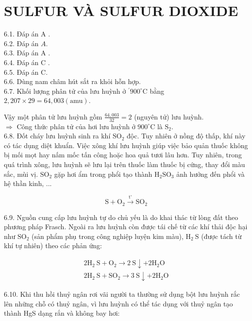 \documentclass[10pt]{article}
\begin{document}
\section*{SULFUR VÀ SULFUR DIOXIDE}
6.1. Đáp án A .\\
6.2. Đáp án $A$.\\
6.3. Đáp án A .\\
6.4. Đáp án C .\\
6.5. Đáp án C.\\
6.6. Dùng nam châm hút sắt ra khỏi hỗn hợp.\\
6.7. Khối lượng phân tử của lưu huỳnh ở $^{\prime} 900^{\circ} \mathrm{C}$ bằng $2,207 \times 29=64,003(\mathrm{amu})$.

Vậy một phân tử lưu huỳnh gồm $\frac{64,003}{32}=2$ (nguyên tử) lưu huỳnh.\\
$\Rightarrow$ Công thức phân tử của hơi lưu huỳnh ở $900^{\circ} \mathrm{C}$ là $\mathrm{S}_{2}$.\\
6.8. Đốt cháy lưu huỳnh sinh ra khí $\mathrm{SO}_{2}$ độc. Tuy nhiên ở nồng độ thấp, khí này có tác dụng diệt khuẩn. Việc xông khí lưu huỳnh giúp việc bảo quản thuốc không bị mối mọt hay nấm mốc tấn công hoặc hoa quả tươi lâu hơn. Tuy nhiên, trong quá trình xông, lưu huỳnh sẽ lưu lại trên thuốc làm thuốc bị cứng, thay đổi màu sắc, mùi vị. $\mathrm{SO}_{2}$ gặp hơi ẩm trong phổi tạo thành $\mathrm{H}_{2} \mathrm{SO}_{3}$ ảnh hưởng đến phổi và hệ thần kinh, ...

$$
\mathrm{S}+\mathrm{O}_{2} \xrightarrow{\mathrm{t}^{\circ}} \mathrm{SO}_{2}
$$

6.9. Nguồn cung cấp lưu huỳnh tự do chủ yếu là do khai thác từ lòng đất theo phương pháp Frasch. Ngoài ra lưu huỳnh còn được tái chế từ các khí thải độc hại như $\mathrm{SO}_{2}$ (sản phẩm phụ trong công nghiệp luyện kim màu), $\mathrm{H}_{2} \mathrm{~S}$ (được tách từ khí tự nhiên) theo các phản ứng:

$$
\begin{gathered}
2 \mathrm{H}_{2} \mathrm{~S}+\mathrm{O}_{2} \rightarrow 2 \mathrm{~S} \downarrow+2 \mathrm{H}_{2} \mathrm{O} \\
2 \mathrm{H}_{2} \mathrm{~S}+\mathrm{SO}_{2} \rightarrow 3 \mathrm{~S} \downarrow+2 \mathrm{H}_{2} \mathrm{O}
\end{gathered}
$$

6.10. Khi thu hồi thuỷ ngân rơi vãi người ta thường sử dụng bột lưu huỳnh rắc lên những chỗ có thuỷ ngân, vì lưu huỳnh có thể tác dụng với thuỷ ngân tạo thành HgS dạng rắn và không bay hơi:
\end{document}
